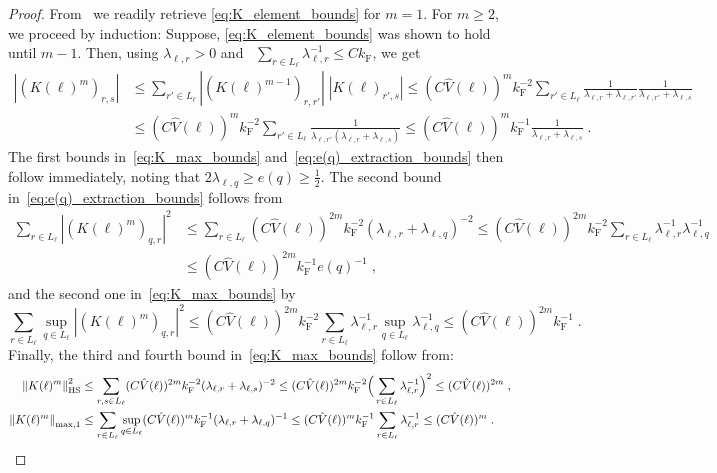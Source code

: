 \documentclass[12pt,a4paper]{article}
\numberwithin{equation}{section}
\newcommand{\1}{\mathbb{I}}
\newcommand{\F}{\mathrm{F}}
\newcommand{\HS}{\mathrm{HS}}
\newcommand{\half}{\frac{1}{2}}
\newcommand{\normmaxi}[1]{\norm{#1}_{\mathrm{max,1}}}
\theoremstyle{plain}
\theoremstyle{definition}
\theoremstyle{remark}
\theoremstyle{plain}
\theoremstyle{definition}
\theoremstyle{remark}
\begin{document}
\begin{proof}
From~\cite[Prop.~7.10]{CHN23} we readily retrieve \eqref{eq:K_element_bounds} for $ m = 1 $. For $ m \ge 2 $, we proceed by induction: Suppose, \eqref{eq:K_element_bounds} was shown to hold until $ m-1 $. Then, using $ \lambda_{\ell,r} > 0 $ and~\cite[Prop.~A.2]{CHN21} $ \sum_{r \in L_\ell} \lambda_{\ell,r}^{-1} \le C k_{\F} $, we get
\begin{equation}
	\begin{aligned}
		|(K(\ell)^m)_{r,s}|
		&\le \sum_{r' \in L_\ell}
		|(K(\ell)^{m-1})_{r,r'}| \;
		|K(\ell)_{r',s}|
		\le (C \hat{V}(\ell))^m k_{\F}^{-2} \sum_{r' \in L_\ell}
		\frac{1}{\lambda_{\ell, r} + \lambda_{\ell, r'}}
		\frac{1}{\lambda_{\ell, r'} + \lambda_{\ell, s}} \\
		&\le (C \hat{V}(\ell))^m k_{\F}^{-2} \sum_{r' \in L_\ell}
		\frac{1}{\lambda_{\ell, r'} (\lambda_{\ell, r} + \lambda_{\ell, s})}
		\le (C \hat{V}(\ell))^m k_{\F}^{-1}
		\frac{1}{\lambda_{\ell, r} + \lambda_{\ell, s}} \;.
	\end{aligned}
\end{equation}
The first bounds in~\eqref{eq:K_max_bounds} and~\eqref{eq:e(q)_extraction_bounds} then follow immediately, noting that $ 2 \lambda_{\ell,q} \ge e(q) \ge \half $. The second bound in~\eqref{eq:e(q)_extraction_bounds} follows from
\begin{equation}
\begin{aligned}
	\sum_{r \in L_\ell} |(K(\ell)^m)_{q,r}|^2
	&\le \sum_{r \in L_\ell} (C \hat{V}(\ell))^{2m} k_{\F}^{-2} (\lambda_{\ell,r} + \lambda_{\ell,q})^{-2}
	\le (C \hat{V}(\ell))^{2m} k_{\F}^{-2} \sum_{r \in L_\ell} \lambda_{\ell,r}^{-1} \lambda_{\ell,q}^{-1} \\
	&\le (C \hat{V}(\ell))^{2m} k_{\F}^{-1} e(q)^{-1} \;,
\end{aligned}
\end{equation}
and the second one in~\eqref{eq:K_max_bounds} by
\begin{equation}
	\sum_{r \in L_\ell} \sup_{q \in L_\ell} |(K(\ell)^m)_{q,r}|^2
	\le (C \hat{V}(\ell))^{2m} k_{\F}^{-2} \sum_{r \in L_\ell} \lambda_{\ell,r}^{-1} 
		\sup_{q \in L_\ell} \lambda_{\ell,q}^{-1}
	\le (C \hat{V}(\ell))^{2m} k_{\F}^{-1} \;.
\end{equation}
Finally, the third and fourth bound in~\eqref{eq:K_max_bounds} follow from:
\begin{equation} \label{eq:max2_HS_bound}
\begin{aligned}
	\norm{K(\ell)^m}_{\HS}^2
	&\le \sum_{r,s \in L_\ell} (C \hat{V}(\ell))^{2m} k_{\F}^{-2} (\lambda_{\ell,r} + \lambda_{\ell,s})^{-2}
	\le (C \hat{V}(\ell))^{2m} k_{\F}^{-2} \Big( \sum_{r \in L_\ell} \lambda_{\ell,r}^{-1} \Big)^2
	\le (C \hat{V}(\ell))^{2m} \;, \\
	\normmaxi{K(\ell)^m} 
	&\leq \sum_{r \in L_\ell} \sup_{q \in L_\ell} (C \hat{V}(\ell))^{m} k_{\F}^{-1} (\lambda_{\ell,r} + \lambda_{\ell,q})^{-1} \le (C \hat{V}(\ell))^{m} k_{\F}^{-1} \sum_{r \in L_\ell} \lambda_{\ell,r}^{-1} \leq (C \hat{V}(\ell))^{m} \;.
\end{aligned}
\end{equation}
\end{proof}
\end{document}
